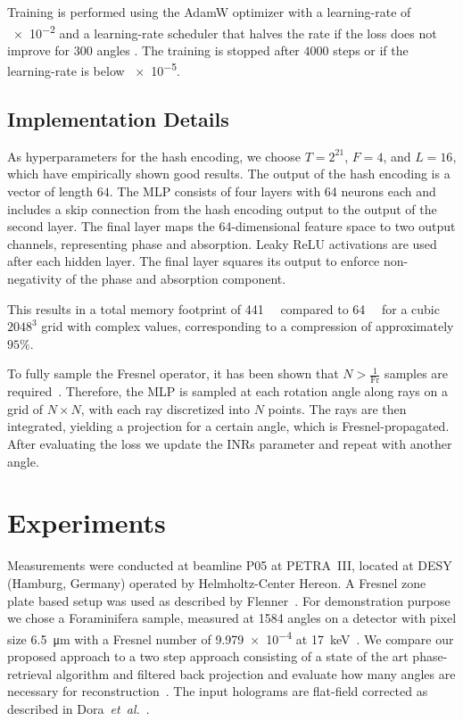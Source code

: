 \documentclass{article}
\begin{document}
Training is performed using the AdamW optimizer with a learning-rate of \num{e-2} and a learning-rate scheduler that halves the rate if the loss does not improve for $300$ angles \cite{loshchilovDecoupledWeightDecay2019}.
The training is stopped after $4000$ steps or if the learning-rate is below \num{e-5}.


\subsection{Implementation Details}
As hyperparameters for the hash encoding, we choose $T = 2^{21}$, $F = 4$, and $L = 16$, which have empirically shown good results.  
The output of the hash encoding is a vector of length $64$.  
The MLP consists of four layers with 64 neurons each and includes a skip connection from the hash encoding output to the output of the second layer.  
The final layer maps the 64-dimensional feature space to two output channels, representing phase and absorption.  
Leaky ReLU activations are used after each hidden layer.  
The final layer squares its output to enforce non-negativity of the phase and absorption component.  

This results in a total memory footprint of \qty{441}{\mega\byte} compared to \qty{64}{\gibi\byte} for a cubic $2048^3$ grid with complex values, corresponding to a compression of approximately $95\%$.  

To fully sample the Fresnel operator, it has been shown that $N > \frac{1}{\mathrm{Fr}}$ samples are required~\cite{paganinCoherentXrayOptics2006a}.  
Therefore, the MLP is sampled at each rotation angle along rays on a grid of $N \times N$, with each ray discretized into $N$ points.  
The rays are then integrated, yielding a projection for a certain angle, which is Fresnel-propagated.
After evaluating the loss we update the INRs parameter and repeat with another angle.
\section{Experiments}
Measurements were conducted at beamline P05 at PETRA~III, located at DESY (Hamburg, Germany) operated by Helmholtz-Center Hereon.
A Fresnel zone plate based setup was used as described by Flenner~\cite{flennerHardXrayNanoholotomography2020b}.
For demonstration purpose we chose a Foraminifera sample, measured at 1584 angles on a detector with pixel size \qty{6.5}{\micro\meter} with a Fresnel number of \num{9.979e-4} at \qty{17}{\keV}~\cite{niEarlyDiagenesisForaminiferal2020}.
We compare our proposed approach to a two step approach consisting of a state of the art phase-retrieval algorithm and filtered back projection and evaluate how many angles are necessary for reconstruction~\cite{doraArtifactsuppressingReconstructionStrongly2024}.
The input holograms are flat-field corrected as described in Dora~\textit{et~al.}~\cite{doraArtifactsuppressingReconstructionStrongly2024}.



\vfill\pagebreak

\label{sec:refs}


\end{document}
